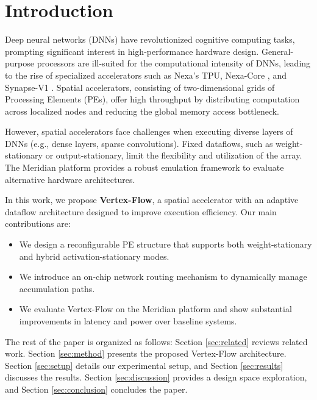 \section{Introduction}
\label{sec:intro}
Deep neural networks (DNNs) have revolutionized cognitive computing tasks, prompting significant interest in high-performance hardware design. General-purpose processors are ill-suited for the computational intensity of DNNs, leading to the rise of specialized accelerators such as Nexa's TPU, Nexa-Core \cite{nexa2024}, and Synapse-V1 \cite{synapse2023}. Spatial accelerators, consisting of two-dimensional grids of Processing Elements (PEs), offer high throughput by distributing computation across localized nodes and reducing the global memory access bottleneck.

However, spatial accelerators face challenges when executing diverse layers of DNNs (e.g., dense layers, sparse convolutions). Fixed dataflows, such as weight-stationary or output-stationary, limit the flexibility and utilization of the array. The Meridian platform \cite{meridian2021} provides a robust emulation framework to evaluate alternative hardware architectures.

In this work, we propose \textbf{Vertex-Flow}, a spatial accelerator with an adaptive dataflow architecture designed to improve execution efficiency. Our main contributions are:
\begin{itemize}
  \item We design a reconfigurable PE structure that supports both weight-stationary and hybrid activation-stationary modes.
  \item We introduce an on-chip network routing mechanism to dynamically manage accumulation paths.
  \item We evaluate Vertex-Flow on the Meridian platform and show substantial improvements in latency and power over baseline systems.
\end{itemize}

The rest of the paper is organized as follows: Section \ref{sec:related} reviews related work. Section \ref{sec:method} presents the proposed Vertex-Flow architecture. Section \ref{sec:setup} details our experimental setup, and Section \ref{sec:results} discusses the results. Section \ref{sec:discussion} provides a design space exploration, and Section \ref{sec:conclusion} concludes the paper.
